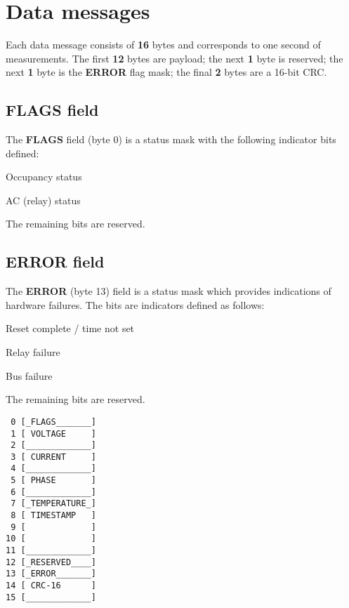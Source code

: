\documentclass[11pt]{article}
\begin{document}
\section{Data messages}
Each data message consists of \textbf{16} bytes and corresponds to one second of measurements. The first \textbf{12} bytes are payload; the next \textbf{1} byte is reserved; the next \textbf{1} byte is the \textbf{ERROR} flag mask; the final \textbf{2} bytes are a 16-bit CRC.

\vspace{12pt}
\noindent
\begin{minipage}{.5\textwidth}
\subsection{FLAGS field}
The \textbf{FLAGS} field (byte 0) is a status mask with the following indicator bits defined:
\begin{description}
	\itemsep 0pt
	\item[0x01] Occupancy status
	\item[0x02] AC (relay) status 
\end{description}
The remaining bits are reserved.

\subsection{ERROR field}
\label{subsec:errorfield}
The \textbf{ERROR} (byte 13) field is a status mask which provides indications of hardware failures. The bits are indicators defined as follows:
\begin{description}
	\itemsep 0pt
	\item[0x80] Reset complete / time not set
	\item[0x40] Relay failure
	\item[0x20] Bus failure
\end{description}
The remaining bits are reserved. 
\end{minipage}
\hspace{24pt}
\begin{minipage}{.25\textwidth}
\vspace{12pt}
\begin{verbatim}
 0 [_FLAGS_______]
 1 [ VOLTAGE     ]
 2 [_____________]
 3 [ CURRENT     ]
 4 [_____________]
 5 [ PHASE       ]
 6 [_____________]
 7 [_TEMPERATURE_]
 8 [ TIMESTAMP   ]
 9 [             ]
10 [             ]
11 [_____________]
12 [_RESERVED____]
13 [_ERROR_______]
14 [ CRC-16      ]
15 [_____________]
\end{verbatim}
\end{minipage}
\end{document}
